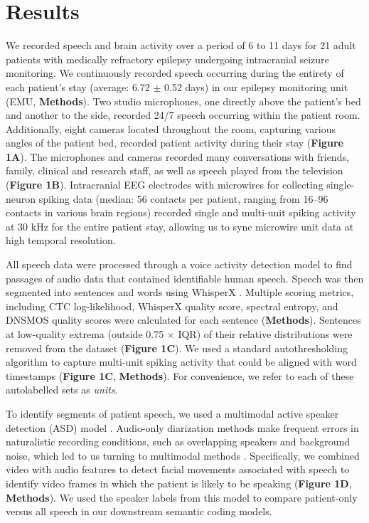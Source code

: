 \documentclass[pdflatex,sn-basic]{sn-jnl}%
\theoremstyle{thmstyleone}%
\theoremstyle{thmstyletwo}%
\theoremstyle{thmstylethree}%
\begin{document}
\clearpage
\section{Results}\label{sec2}

We recorded speech and brain activity over a period of 6 to 11 days for 21 adult patients with medically refractory epilepsy undergoing intracranial seizure monitoring. We continuously recorded speech occurring during the entirety of each patient's stay (average: 6.72 $\pm$ 0.52 days) in our epilepsy monitoring unit (EMU, \textbf{Methods}). Two studio microphones, one directly above the patient's bed and another to the side, recorded 24/7 speech occurring within the patient room. Additionally, eight cameras located throughout the room, capturing various angles of the patient bed, recorded patient activity during their stay (\textbf{Figure 1A}). The microphones and cameras recorded many conversations with friends, family, clinical and research staff, as well as speech played from the television (\textbf{Figure 1B}). Intracranial EEG electrodes with microwires for collecting single-neuron spiking data (median: 56 contacts per patient, ranging from 16--96 contacts in various brain regions) recorded single and multi-unit spiking activity at 30 kHz for the entire patient stay, allowing us to sync microwire unit data at high temporal resolution.

All speech data were processed through a voice activity detection model \citep{bib43} to find passages of audio data that contained identifiable human speech. Speech was then segmented into sentences and words using WhisperX \citep{bib39}. Multiple scoring metrics, including CTC log-likelihood, WhisperX quality score, spectral entropy, and DNSMOS quality scores were calculated for each sentence (\textbf{Methods}). Sentences at low-quality extrema (outside 0.75 $\times$ IQR) of their relative distributions were removed from the dataset (\textbf{Figure 1C}). We used a standard autothresholding algorithm \citep{bib112,bib113,bib114} to capture multi-unit spiking activity that could be aligned with word timestamps (\textbf{Figure 1C}, \textbf{Methods}). For convenience, we refer to each of these autolabelled sets as \textit{units}.

To identify segments of patient speech, we used a multimodal active speaker detection (ASD) model \citep{bib44}. Audio-only diarization methods make frequent errors in naturalistic recording conditions, such as overlapping speakers and background noise, which led to us turning to multimodal methods \citep{bib45,bib46}. Specifically, we combined video with audio features to detect facial movements associated with speech to identify video frames in which the patient is likely to be speaking (\textbf{Figure 1D}, \textbf{Methods}). We used the speaker labels from this model to compare patient-only versus all speech in our downstream semantic coding models.
\end{document}
